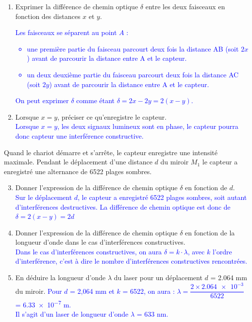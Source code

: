 \documentclass[a4paper,11pt,fleqn]{article}%
\begin{document}
\begin{enumerate}
    \item Exprimer la différence de chemin optique $\delta$ entre les deux faisceaux en fonction des distances $x$ et $y$.\\
    \textcolor{blue}{Les faisceaux se séparent au point $A$ :
    \begin{itemize}
        \item une première partie du faisceau parcourt deux fois la distance AB (soit $2x$) avant de parcourir la distance entre A et le capteur.
        \item un deux deuxième partie du faisceau parcourt deux fois la distance AC (soit $2y$) avant de parcourir la distance entre A et le capteur.
    \end{itemize}
    On peut exprimer $\delta$ comme étant $\delta = 2x - 2y = 2(x-y)$.}
    \item Lorsque $x=y$, préciser ce qu'enregistre le capteur.\\
    \textcolor{blue}{Lorsque $x = y$, les deux signaux lumineux sont en phase, le capteur pourra donc capteur une interférence constructive.}
\end{enumerate}
Quand le chariot démarre et s'arrête, le capteur enregistre une intensité maximale. Pendant le déplacement d'une distance $d$ du miroir $M_1$ le capteur a enregistré une alternance de 6522 plages sombres.
\begin{enumerate}
\setcounter{enumi}{2}
    \item Donner l'expression de la différence de chemin optique $\delta$ en fonction de $d$.\\
    \textcolor{blue}{Sur le déplacement $d$, le capteur a enregistré 6522 plages sombres, soit autant d'interférences destructives. La différence de chemin optique est donc de $\delta = 2(x-y) = 2d$}
    \item Donner l'expression de la différence de chemin optique $\delta$ en fonction de la longueur d'onde dans le cas d'interférences constructives.\\
    \textcolor{blue}{Dans le cas d'interférences constructives, on aura $\delta = k\cdot \lambda$, avec $k$ l'ordre d'interférence, c'est à dire le nombre d'interférences constructives rencontrées.}
    \item En déduire la longueur d'onde $\lambda$ du laser pour un déplacement $d$ = \num{2,064} \unit{\milli\meter} du miroir.
    \textcolor{blue}{Pour $d$ = 2,064 \unit{\milli\meter} et $k$ = 6522, on aura :  $\lambda = \dfrac{2 \times\num{ 2,064e-3}}{6522}$ = \num{6,33e-7} \unit{\meter}.\\
    Il s'agit d'un laser de longueur d'onde $\lambda$ = 633 \unit{\nano\meter}.}
\end{enumerate}
\end{document}
